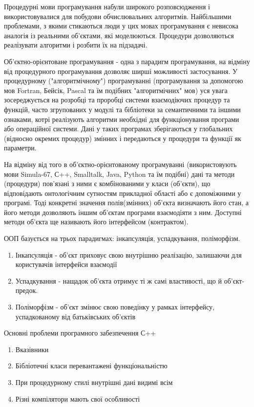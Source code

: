 Процедурні мови програмування набули широкого розповсюдження і використовувалися для побудови обчислювальних алгоритмів.
Найбільшими проблемами, з якими стикаються люди у цих мовах програмування є невисока аналогія із реальними об'єктами,
які моделюються. Процедури дозволяються реалізувати алгоритми і розбити їх на підзадачі.

Об'єктно-орієнтоване програмування - одна з парадигм програмування, на відміну від процедурного програмування дозволяє
ширші можливості застосування. У процедурному ("алгоритмічному") програмуванні (програмування за допомогою мов Fortran,
Бейсік, Pascal та їм подібних "алгоритмічних" мов) уся увага зосереджується на розробці та проробці системи взаємодіючих
процедур та функцій, часто згрупованих у модулі та бібліотеки за семантичними та іншими ознаками, котрі реалізують
алгоритми необхідні для функціонування програми або операційної системи. Дані у таких програмах зберігаються у
глобальних (відносно окремих процедур) змінних і передаються у процедури та функції як параметри.

На відміну від того в об'єктно-орієнтованому програмуванні (використовують мови Simula-67, С++, Smalltalk, Java, Python
та їм подібні) дані та методи (процедури) пов'язані з ними є комбінованими у класи (об'єкти), що відповідають
онтологічним сутностям прикладної області або є допоміжними у програмі. Тоді конкретні значення полів(змінних) об'єкта
визначають його стан, а його методи дозволяють іншим об'єктам програми взаємодіяти з ним. Доступні методи об'єкта ще
називають його інтерфейсом (контрактом).

ООП базується на трьох парадигмах: інкапсуляція, успадкування, поліморфізм.

\begin{enumerate}
\item
  Інкапсуляція - об'єкт приховує свою внутрішню реалізацію, залишаючи
  для користувачів інтерфейси взаємодії
\item
  Успадкування - нащадок об'єкта отримує ті ж самі властивості, що й
  об'єкт-предок.
\item
  Поліморфізм - об'єкт змінює свою поведінку у рамках інтерфейсу,
  успадкованому від батьківських об'єктів
\end{enumerate}

Основні проблеми програмного забезпечення С++

\begin{enumerate}
\item
  Вказівники
\item
  Бібліотечні класи перевантажені функціональністю
\item
  При процедурному стилі внутрішні дані видимі всім
\item
  Різні компілятори мають свої особливості
\end{enumerate}

